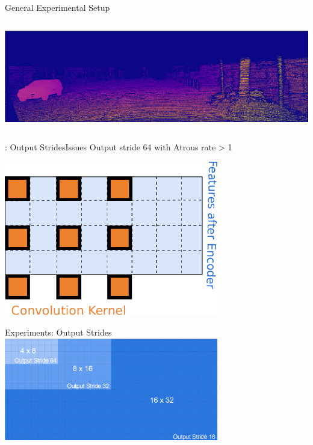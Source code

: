 \documentclass[11pt]{beamer}
\begin{document}
\begin{frame}[c]{General Experimental Setup}
\begin{columns}
\begin{column}{0.5\textwidth}
            \includegraphics[width=1.0\textwidth]{figures/kitti_gt.png}

        \end{column}
   \end{columns}
\end{frame}

\begin{frame}[c]{\subsecname: Output Strides}{Issues}
  Output stride 64 with Atrous rate > 1
  \begin{center}
    \includegraphics[width=0.7\textwidth]{figures/architecture/os64-atrous-conv-with-text.pdf}
  \end{center}
\end{frame}

\begin{frame}[c]{Experiments: Output Strides}
\centering
\includegraphics[width=0.7\textwidth]{figures/images/output_stride_text.png}
\vfill
\pause

\end{frame}
\end{document}
